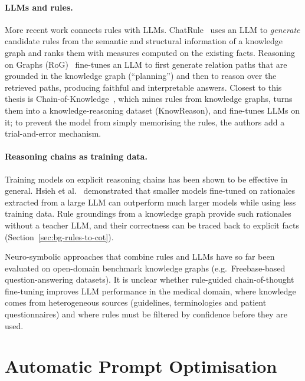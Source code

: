 \paragraph{LLMs and rules.}
More recent work connects rules with LLMs. ChatRule~\cite{luo2025chatrule}
uses an LLM to \emph{generate} candidate rules from the semantic and
structural information of a knowledge graph and ranks them with
measures computed on the existing facts. Reasoning on Graphs
(RoG)~\cite{luo2024reasoning} fine-tunes an LLM to first generate relation
paths that are grounded in the knowledge graph (``planning'') and then to
reason over the retrieved paths, producing faithful and interpretable
answers. Closest to this thesis is Chain-of-Knowledge~\cite{zhang2024chain},
which mines rules from knowledge graphs, turns them into a knowledge-reasoning
dataset (KnowReason), and fine-tunes LLMs on it; to prevent the model from
simply memorising the rules, the authors add a trial-and-error mechanism.

\paragraph{Reasoning chains as training data.}
Training models on explicit reasoning chains has been shown to be
effective in general. Hsieh et al.~\cite{hsieh2023distilling} demonstrated
that smaller models fine-tuned on rationales extracted from a large LLM can
outperform much larger models while using less training data. Rule
groundings from a knowledge graph provide such rationales without a teacher
LLM, and their correctness can be traced back to explicit facts
(Section~\ref{sec:bg-rules-to-cot}).

\begin{rwgap}
Neuro-symbolic approaches that combine rules and LLMs have so far been
evaluated on open-domain benchmark knowledge graphs (e.g.\ Freebase-based
question-answering datasets).
It is unclear whether rule-guided chain-of-thought fine-tuning improves LLM
performance in the medical domain, where knowledge comes from heterogeneous
sources (guidelines, terminologies and patient questionnaires) and where
rules must be filtered by confidence before they are used.
\end{rwgap}

\section{Automatic Prompt Optimisation}
\label{sec:rw-prompt}

